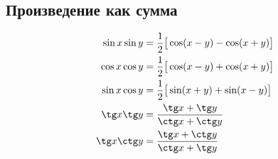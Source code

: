 \subsection*{Произведение как сумма}

\begin{align*}
  \sin x \sin y &= \frac{1}{2}\big[\cos(x - y) - \cos(x + y)\big]\\
  \cos x \cos y &= \frac{1}{2}\big[\cos(x - y) + \cos(x + y)\big]\\
  \sin x \cos y &= \frac{1}{2}\big[\sin(x + y) + \sin(x - y)\big]\\
  \tg x \tg y &= \frac{ \tg x + \tg y }{ \ctg x + \ctg y }\\
  \tg x \ctg y &= \frac{ \tg x + \ctg y }{ \ctg x + \tg y }
\end{align*}
